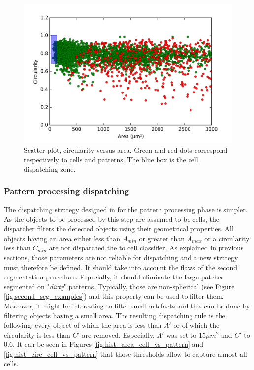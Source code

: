\begin{figure}
	\center
	\includegraphics[scale=0.75]{image/scatter_cells_patterns_0_5000.png}
	\caption{Scatter plot, circularity versus area. Green and red dots correspond respectively to cells and patterns. The blue box is the cell dispatching zone.}
	\label{fig:scatter_area_circ_cell_vs_pattern}
\end{figure}

\subsubsection{Pattern processing dispatching}
	
The dispatching strategy designed in \cite{adeblire2013} for the pattern processing phase is simpler. As the objects to be processed by this step are assumed to be cells, the dispatcher filters the detected objects using their geometrical properties. All objects having an area either less than $A_{min}$ or greater than $A_{max}$ or a circularity less than $C_{min}$ are not dispatched the to cell classifier. As explained in previous sections, those parameters are not reliable for dispatching and a new strategy must therefore be defined. It should take into account the flaws of the second segmentation procedure. Especially, it should eliminate the large patches segmented on "\textit{dirty}" patterns. Typically, those are non-spherical (see Figure \ref{fig:second_seg_examples}) and this property can be used to filter them. Moreover, it might be interesting to filter small artefacts and this can be done by filtering objects having a small area. The resulting dispatching rule is the following: every object of which the area is less than $A'$ or of which the circularity is less than $C'$ are removed. Especially, $A'$ was set to $15 \mu m^2$ and $C'$ to $0.6$. It can be seen in Figures \ref{fig:hist_area_cell_vs_pattern} and \ref{fig:hist_circ_cell_vs_pattern} that those thresholds allow to capture almost all cells. 

